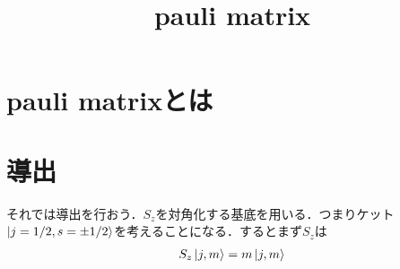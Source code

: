 \documentclass[a4j]{jarticle}
\title{pauli matrix}
\begin{document}
\section{pauli matrixとは}

\section{導出}
それでは導出を行おう．$S_z$を対角化する基底を用いる．つまりケット$\ket{j=1/2,s=\pm 1/2}$を考えることになる．するとまず$S_z$は
\begin{align*}
 S_z\ket{j,m}=m\ket{j,m}
\end{align*}
\end{document}
